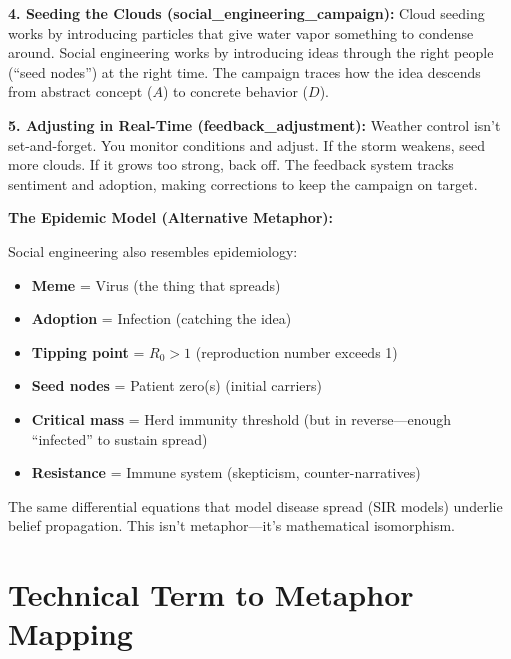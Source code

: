 \begin{tcolorbox}[colback=green!5!white,colframe=green!65!black,title=\textbf{Plain English: The Social Weather System},breakable]
\textbf{4. Seeding the Clouds (social\_engineering\_campaign):}
Cloud seeding works by introducing particles that give water vapor something to condense around. Social engineering works by introducing ideas through the right people (``seed nodes'') at the right time. The campaign traces how the idea descends from abstract concept ($A$) to concrete behavior ($D$).

\textbf{5. Adjusting in Real-Time (feedback\_adjustment):}
Weather control isn't set-and-forget. You monitor conditions and adjust. If the storm weakens, seed more clouds. If it grows too strong, back off. The feedback system tracks sentiment and adoption, making corrections to keep the campaign on target.

\textbf{The Epidemic Model (Alternative Metaphor):}

Social engineering also resembles epidemiology:
\begin{itemize}
    \item \textbf{Meme} = Virus (the thing that spreads)
    \item \textbf{Adoption} = Infection (catching the idea)
    \item \textbf{Tipping point} = $R_0 > 1$ (reproduction number exceeds 1)
    \item \textbf{Seed nodes} = Patient zero(s) (initial carriers)
    \item \textbf{Critical mass} = Herd immunity threshold (but in reverse---enough ``infected'' to sustain spread)
    \item \textbf{Resistance} = Immune system (skepticism, counter-narratives)
\end{itemize}

The same differential equations that model disease spread (SIR models) underlie belief propagation. This isn't metaphor---it's mathematical isomorphism.

\end{tcolorbox}

\section{Technical Term to Metaphor Mapping}

